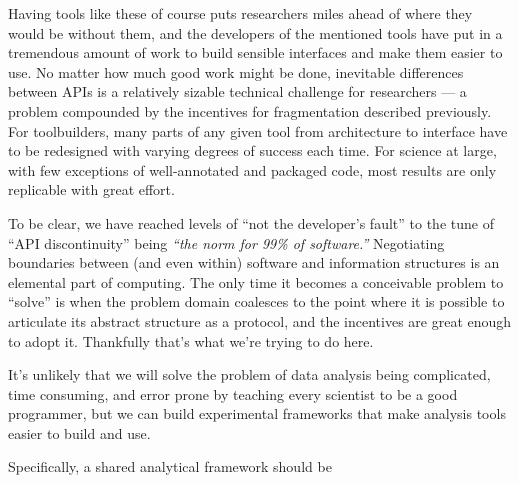 \documentclass[10pt]{article}
\begin{document}
\begin{multicols}{2}
Having tools like these of course puts researchers miles ahead of where
they would be without them, and the developers of the mentioned tools
have put in a tremendous amount of work to build sensible interfaces and
make them easier to use. No matter how much good work might be done,
inevitable differences between APIs is a relatively sizable technical
challenge for researchers --- a problem compounded by the incentives for
fragmentation described previously. For toolbuilders, many parts of any
given tool from architecture to interface have to be redesigned with
varying degrees of success each time. For science at large, with few
exceptions of well-annotated and packaged code, most results are only
replicable with great effort.

To be clear, we have reached levels of ``not the developer's fault'' to
the tune of ``API discontinuity'' being \emph{``the norm for 99\% of
software.''} Negotiating boundaries between (and even within) software
and information structures is an elemental part of computing. The only
time it becomes a conceivable problem to ``solve'' is when the problem
domain coalesces to the point where it is possible to articulate its
abstract structure as a protocol, and the incentives are great enough to
adopt it. Thankfully that's what we're trying to do here.

It's unlikely that we will solve the problem of data analysis being
complicated, time consuming, and error prone by teaching every scientist
to be a good programmer, but we can build experimental frameworks that
make analysis tools easier to build and use.

Specifically, a shared analytical framework should be

\begin{itemize}


\end{itemize}
\end{multicols}
\end{document}
